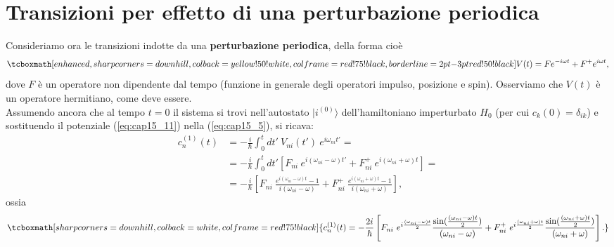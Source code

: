 \section{Transizioni per effetto di una perturbazione periodica}
Consideriamo ora le transizioni indotte da una \textbf{perturbazione periodica}, della forma cioè
	\begin{equation}
		\tcboxmath[enhanced, sharp corners=downhill, colback=yellow!50!white, colframe=red!75!black, borderline={2pt}{-3pt}{red!50!black}]{
			V(t) = Fe^{-i\omega t} + F^+ e ^{i\omega t},
			}
	\label{eq:cap15_11}
	\end{equation}
dove $F$ è un operatore non dipendente dal tempo (funzione in generale degli operatori impulso, posizione e spin). Osserviamo che $V(t)$ è un operatore hermitiano, come deve essere.	\\

Assumendo ancora che al tempo $t=0$ il sistema si trovi nell'autostato $\vert i ^{(0)}\rangle$ dell'hamiltoniano imperturbato $H_0$ (per cui $c_k (0) = \delta _{ik}$) e sostituendo il potenziale (\ref{eq:cap15_11}) nella (\ref{eq:cap15_5}), si ricava:
	\begin{align}
		c_n ^{(1)}(t) & =  -\frac{i}{\hbar}\int _0 ^t dt'\ V_{ni} (t') \ e^{i\omega _{ni}t'} = \nonumber \\
		&= -\frac{i}{\hbar}\int _0 ^t dt'\left[ F_{ni}\ e^{i(\omega _{ni}-\omega) t'} + F_{ni} ^+\ e ^{i(\omega _{ni} +\omega) t}\right] = \nonumber \\
		&= -\frac{i}{\hbar}\left[ F_{ni}\ \frac{e^{i(\omega _{ni}-\omega) t}-1}{i(\omega _{ni}-\omega)} + F_{ni} ^+\ \frac{e ^{i(\omega _{ni} +\omega) t}-1}{i(\omega _{ni}+\omega)}\right], 
	\end{align}
ossia
	\begin{equation}
		\tcboxmath[sharp corners=downhill, colback=white, colframe=red!75!black]{
			c_n ^{(1)}(t)= -\frac{2i}{\hbar}\left[ F_{ni}\ e^{i\frac{(\omega _{ni}-\omega) t}{2}}\frac{\sin(\frac{(\omega _{ni}-\omega) t}{2})}{(\omega _{ni}-\omega)}  + F_{ni} ^+\ e^{i\frac{(\omega _{ni}+\omega) t}{2}}\frac{\sin(\frac{(\omega _{ni}+\omega) t}{2})}{(\omega _{ni}+\omega)}\right].
			}
	\label{eq:cap15_12}
	\end{equation}\\
	
